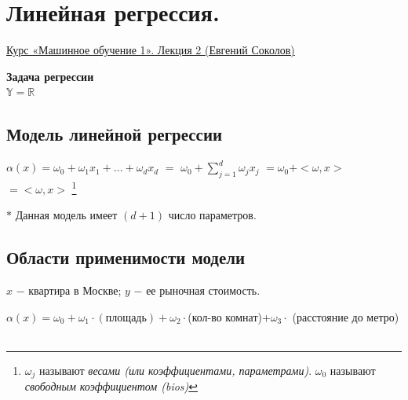 \newpage
\section{Линейная регрессия.}    
    \href{https://www.youtube.com/watch?v=MA66hFXaq7o&list=PLEqoHzpnmTfChItexxg2ZfxCsm-8QPsdS&index=2}{Курс «Машинное обучение 1». Лекция 2 (Евгений Соколов)}\\

    \begin{center}
        \textbf{Задача регрессии}\\
        
        $\mathbb{Y} = \mathbb{R}$
    \end{center}

    \subsection{Модель линейной регрессии}
        \begin{center}
            $\alpha(x) = \omega_0 + \omega_1x_1 + ... + \omega_dx_d$ \quad $=$ $\omega_0 + \sum\limits_{j=1}^d \omega_jx_j$ \quad $= \omega_0 + <\omega, x>$ \quad $= <\omega, x>$  \footnote{$\omega_j$ называют \textit{весами (или коэффициентами, параметрами)}. $\omega_0$ называют \textit{свободным коэффициентом (bios)}}

            $\ast$ Данная модель имеет $(d+1)$ число параметров.
        \end{center}
        
    \subsection{Области применимости модели}
        $x$ $-$ квартира в Москве; $y$ $-$ ее рыночная стоимость.

        $\alpha(x) = \omega_0 + \omega_1 \cdot (площадь) + \omega_2 \cdot $(кол-во комнат)$  + \omega_3 \cdot$ (расстояние до метро)\\
        
        \\

